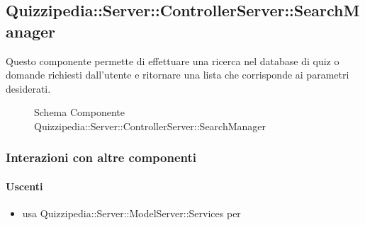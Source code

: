 \subsection{Quizzipedia::Server::ControllerServer::SearchManager}
Questo componente permette di effettuare una ricerca nel database di quiz o domande richiesti dall'utente e ritornare una lista che corrisponde ai parametri desiderati.
\begin{figure}[H]
\centering
\noindent{}
\caption[Schema Componente Quizzipedia::Server::ControllerServer::SearchManager]{Schema Componente Quizzipedia::Server::ControllerServer::SearchManager}
\end{figure}
\subsubsection{Interazioni con altre componenti}
\paragraph{Uscenti}
\begin{itemize}
\item usa Quizzipedia::Server::ModelServer::Services per 
\end{itemize}
